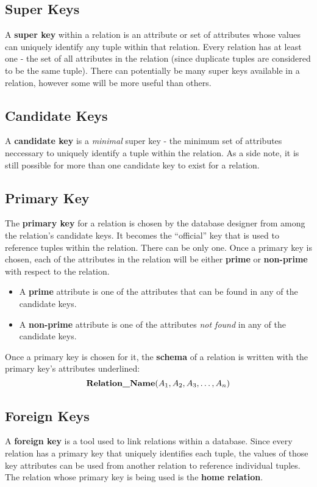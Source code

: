 \documentclass{report}
\begin{document}
    \subsection*{Super Keys}
    A \textbf{super key} within a relation is an attribute or set of attributes whose values can uniquely identify any tuple within that relation. Every relation has at least one - the set of all attributes in the relation (since duplicate tuples are considered to be the same tuple). There can potentially be many super keys available in a relation, however some will be more useful than others.
    \subsection*{Candidate Keys}
    A \textbf{candidate key} is a \textit{minimal} super key - the minimum set of attributes neccessary to uniquely identify a tuple within the relation. As a side note, it is still possible for more than one candidate key to exist for a relation.
    \subsection*{Primary Key}
    The \textbf{primary key} for a relation is chosen by the database designer from among the relation's candidate keys. It becomes the ``official'' key that is used to reference tuples within the relation. There can be only one.
\bigbreak \noindent
Once a primary key is chosen, each of the attributes in the relation will be either \textbf{prime} or \textbf{non-prime} with respect to the relation.
\begin{itemize}
    \item A \textbf{prime} attribute is one of the attributes that can be found in any of the candidate keys.
    \item A \textbf{non-prime} attribute is one of the attributes \textit{not found} in any of the candidate keys.
\end{itemize}
Once a primary key is chosen for it, the \textbf{schema} of a relation is written with the primary key's attributes underlined:
$$\text{\textbf{Relation\_Name}}(A_1, A_2, A_3,\ldots, A_n)$$
\subsection*{Foreign Keys}
A \textbf{foreign key} is a tool used to link relations within a database. Since every relation has a primary key that uniquely identifies each tuple, the values of those key attributes can be used from another relation to reference individual tuples.
\bigbreak \noindent
The relation whose primary key is being used is the \textbf{home relation}.
\end{document}
